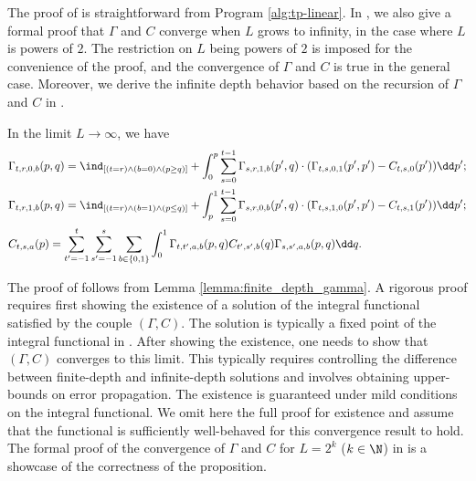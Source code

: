 The proof of  is straightforward from Program \ref{alg:tp-linear}. 
In , we also give a formal proof that $\Gamma$ and $C$ converge when $L$ grows to infinity, in the case where $L$ is powers of $2$. The restriction on $L$ being powers of $2$ is imposed for the convenience of the proof, and the convergence of $\Gamma$ and $C$ is true in the general case.
Moreover, we derive the infinite depth behavior based on the recursion of $\Gamma$ and $C$ in .

\begin{prop}\label{prop:infinite_depth_linear}
In the limit $L\to \infty$, we  have 
\begin{align*}
  & \Gamma_{t,r,0,b}(p, q)=\ind_{[(t=r) \wedge (b=0) \wedge (p\geq q)]} + \int_0^p \sum_{s=0}^{t-1}\Gamma_{s,r,1,b}(p',q)\cdot (\Gamma_{t,s,0,1}(p', p')- C_{t,s,0}(p'))\dd p'; \\
     & \Gamma_{t,r,1,b}(p, q) = \ind_{[(t=r) \wedge (b=1) \wedge (p\leq q)]} + \int_p^1 \sum_{s=0}^{t-1} \Gamma_{s,r,0,b}(p',q) \cdot (\Gamma_{t,s,1,0}(p',p') - C_{t,s,1}(p'))\dd p';\\
     & C_{t,s,a}(p)=\sum_{t'=-1}^{t}\sum_{s'=-1}^{s}\sum_{b\in\{0,1\}}\int_0^1 \Gamma_{t,t',a,b}(p,q) C_{t',s',b}(q)\Gamma_{s,s',a,b}(p,q) \dd q.
\end{align*}
\end{prop}

The proof of  follows from Lemma \ref{lemma:finite_depth_gamma}. A rigorous proof requires first showing the existence of a solution of the integral functional satisfied by the couple $(\Gamma, C)$. The solution is typically a fixed point of the integral functional in . After showing the existence, one needs to show that $(\Gamma, C)$ converges to this limit. This typically requires controlling the difference between finite-depth and infinite-depth solutions and involves obtaining upper-bounds on error propagation. The existence is guaranteed under mild conditions on the integral functional. We omit here the full proof for existence and assume that the functional is sufficiently well-behaved for this convergence result to hold. The formal proof of the convergence of $\Gamma$ and $C$ for $L=2^k$ ($k\in \N$) in  is a showcase of the correctness of the proposition.

